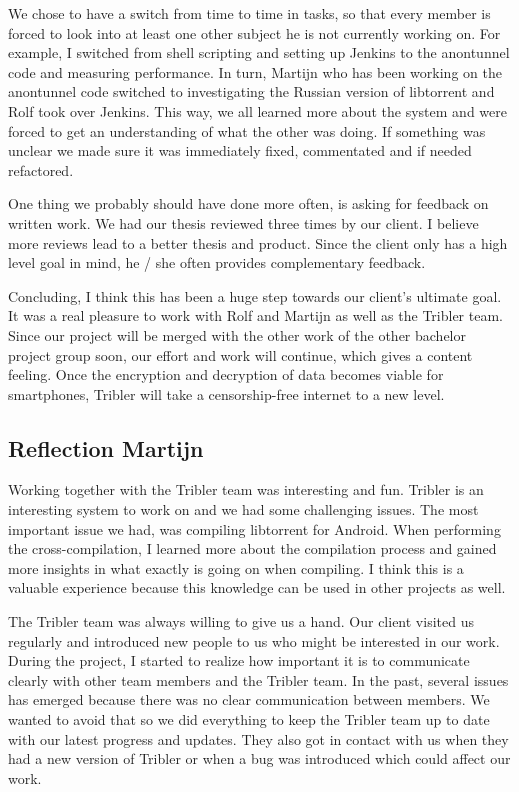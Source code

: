 			
			We chose to have a switch from time to time in tasks, so that every member is forced to look into at least one other subject he is not currently working on. For example, I switched from shell scripting and setting up Jenkins to the anontunnel code and measuring performance. In turn, Martijn who has been working on the anontunnel code switched to investigating the Russian version of libtorrent and Rolf took over Jenkins. This way, we all learned more about the system and were forced to get an understanding of what the other was doing. If something was unclear we made sure it was immediately fixed, commentated and if needed refactored.
			
			
			One thing we probably should have done more often, is asking for feedback on written work. We had our thesis reviewed three times by our client. I believe more reviews lead to a better thesis and product. Since the client only has a high level goal in mind, he / she often provides complementary feedback.
			
			
			Concluding, I think this has been a huge step towards our client's ultimate goal. It was a real pleasure to work with Rolf and Martijn as well as the Tribler team. Since our project will be merged with the other work of the other bachelor project group soon, our effort and work will continue, which gives a content feeling. Once the encryption and decryption of data becomes viable for smartphones, Tribler will take a censorship-free internet to a new level.
		
		\subsection{Reflection Martijn}
			Working together with the Tribler team was interesting and fun. Tribler is an interesting system to work on and we had some challenging issues. The most important issue we had, was compiling libtorrent for Android. When performing the cross-compilation, I learned more about the compilation process and gained more insights in what exactly is going on when compiling. I think this is a valuable experience because this knowledge can be used in other projects as well.
		
			The Tribler team was always willing to give us a hand. Our client visited us regularly and introduced new people to us who might be interested in our work. During the project, I started to realize how important it is to communicate clearly with other team members and the Tribler team. In the past, several issues has emerged because there was no clear communication between members. We wanted to avoid that so we did everything to keep the Tribler team up to date with our latest progress and updates. They also got in contact with us when they had a new version of Tribler or when a bug was introduced which could affect our work.
		
